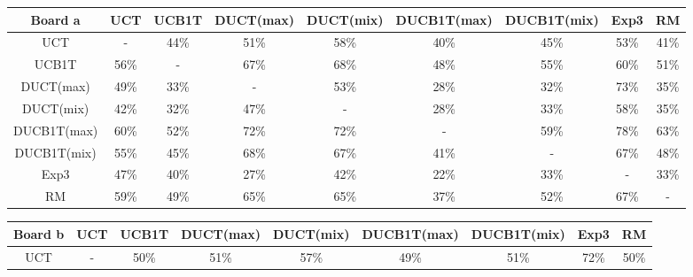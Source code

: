 \documentclass{article}
\begin{document}
\begin{table}[t]\scriptsize
\centering
\begin{tabular}{|c||c|c|c|c|c|c|c|c|}
									\hline
  Board a 		& UCT 	& UCB1T		& DUCT(max)	& DUCT(mix)	& DUCB1T(max)	& DUCB1T(mix)	& Exp3	& RM				\\ 	\hline\hline
   UCT &    - & 44\% & 51\% & 58\% & 40\% & 45\% & 53\% & 41\% \\ \hline 
 UCB1T & 56\% &    - & 67\% & 68\% & 48\% & 55\% & 60\% & 51\% \\ \hline 
   DUCT(max) & 49\% & 33\% &    - & 53\% & 28\% & 32\% & 73\% & 35\% \\ \hline 
   DUCT(mix) & 42\% & 32\% & 47\% &    - & 28\% & 33\% & 58\% & 35\% \\ \hline 
 DUCB1T(max) & 60\% & 52\% & 72\% & 72\% &    - & 59\% & 78\% & 63\% \\ \hline 
 DUCB1T(mix) & 55\% & 45\% & 68\% & 67\% & 41\% &    - & 67\% & 48\% \\ \hline 
      Exp3 & 47\% & 40\% & 27\% & 42\% & 22\% & 33\% &    - & 33\% \\ \hline 
        RM & 59\% & 49\% & 65\% & 65\% & 37\% & 52\% & 67\% &    - \\ \hline 
\end{tabular}
\begin{tabular}{|c||c|c|c|c|c|c|c|c|}
									\hline
  Board b 		& UCT 	& UCB1T		& DUCT(max)	& DUCT(mix)	& DUCB1T(max)	& DUCB1T(mix)	& Exp3	& RM				\\ 	\hline\hline
   UCT &    - & 50\% & 51\% & 57\% & 49\% & 51\% & 72\% & 50\% \\ \hline 

\end{tabular}
\end{table}
\end{document}
